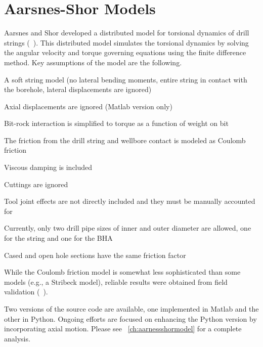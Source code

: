 \section{Aarsnes-Shor Models}
Aarsnes and Shor developed a distributed model for torsional dynamics of drill strings (~\cite{ref:aarsnes2017a}). This distributed model simulates the torsional dynamics by solving the angular velocity and torque governing equations using the finite difference method. Key assumptions of the model are the following.
\begin{bulletedlist}
	\item A soft string model (no lateral bending moments, entire string in contact with the borehole, lateral displacements are ignored)
	\item Axial displacements are ignored (Matlab version only)
	\item Bit-rock interaction is simplified to torque as a function of weight on bit
	\item The friction from the drill string and wellbore contact is modeled as Coulomb friction
    \item Viscous damping is included
    \item Cuttings are ignored
    \item Tool joint effects are not directly included and they must be manually accounted for
    \item Currently, only two drill pipe sizes of inner and outer diameter are allowed, one for the string and one for the BHA
    \item Cased and open hole sections have the same friction factor
\end{bulletedlist}

While the Coulomb friction model is somewhat less sophisticated than some models (e.g., a Stribeck model), reliable results were obtained from field validation (~\cite{ref:aarsnes2017a}).

Two versions of the source code are available, one implemented in Matlab and the other in Python.  Ongoing efforts are focused on enhancing the Python version by incorporating axial motion. Please see \chaptername~\ref{ch:aarnessshormodel} for a complete analysis.

